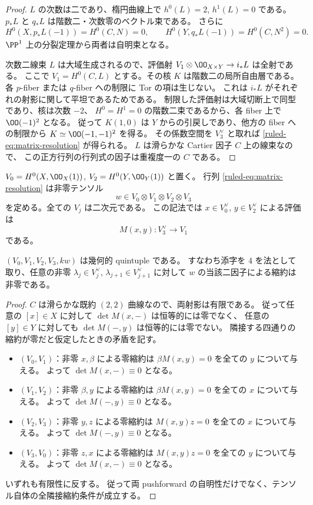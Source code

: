 \begin{proof}
$L$ の次数は二であり、楕円曲線上で $h^0(L)=2$, $h^1(L)=0$ である。
$p_*L$ と $q_*L$ は階数二・次数零のベクトル束である。
さらに
\[
 H^0(X,p_*L(-1))=H^0(C,N)=0,
 \qquad H^0(Y,q_*L(-1))=H^0(C,N^2)=0.
\]
$\PP^1$ 上の分裂定理から両者は自明束となる。

次数二線束 $L$ は大域生成されるので、評価射
$V_1\otimes\OO_{X\times Y}\to i_*L$ は全射である。
ここで $V_1=H^0(C,L)$ とする。その核 $K$ は階数二の局所自由層である。
各 $p$-fiber または $q$-fiber への制限に Tor の項は生じない。
これは $i_*L$ がそれぞれの射影に関して平坦であるためである。
制限した評価射は大域切断上で同型であり、核は次数 $-2$、
$H^0=H^1=0$ の階数二束であるから、各 fiber 上で $\OO(-1)^2$ となる。
従って $K(1,0)$ は $Y$ からの引戻しであり、他方の fiber への制限から
$K\simeq\OO(-1,-1)^2$ を得る。
その係数空間を $V_3^\vee$ と取れば \eqref{ruled-eq:matrix-resolution} が得られる。
$L$ は滑らかな Cartier 因子 $C$ 上の線束なので、
この正方行列の行列式の因子は重複度一の $C$ である。
\end{proof}

$V_0=H^0(X,\OO_X(1))$, $V_2=H^0(Y,\OO_Y(1))$ と置く。
行列 \eqref{ruled-eq:matrix-resolution} は非零テンソル
\[
 w\in V_0\otimes V_1\otimes V_2\otimes V_3
\]
を定める。全ての $V_j$ は二次元である。
この記法では $x\in V_0^\vee$, $y\in V_2^\vee$ による評価は
\[
 M(x,y):V_3^\vee\longrightarrow V_1
\]
である。

\begin{proposition}\label{ruled-prop:geometric}
$(V_0,V_1,V_2,V_3,kw)$ は幾何的 quintuple である。
すなわち添字を $4$ を法として取り、任意の非零
$\lambda_j\in V_j^\vee$, $\lambda_{j+1}\in V_{j+1}^\vee$ に対して
$w$ の当該二因子による縮約は非零である。
\end{proposition}

\begin{proof}
$C$ は滑らかな既約 $(2,2)$ 曲線なので、両射影は有限である。
従って任意の $[x]\in X$ に対して $\det M(x,-)$ は恒等的には零でなく、
任意の $[y]\in Y$ に対しても $\det M(-,y)$ は恒等的には零でない。
隣接する四通りの縮約が零だと仮定したときの矛盾を記す。
\begin{itemize}
\item $(V_0,V_1)$：非零 $x,\beta$ による零縮約は
  $\beta M(x,y)=0$ を全ての $y$ について与える。
  よって $\det M(x,-)\equiv0$ となる。
\item $(V_1,V_2)$：非零 $\beta,y$ による零縮約は
  $\beta M(x,y)=0$ を全ての $x$ について与える。
  よって $\det M(-,y)\equiv0$ となる。
\item $(V_2,V_3)$：非零 $y,z$ による零縮約は
  $M(x,y)z=0$ を全ての $x$ について与える。
  よって $\det M(-,y)\equiv0$ となる。
\item $(V_3,V_0)$：非零 $z,x$ による零縮約は
  $M(x,y)z=0$ を全ての $y$ について与える。
  よって $\det M(x,-)\equiv0$ となる。
\end{itemize}
いずれも有限性に反する。
従って両 pushforward の自明性だけでなく、テンソル自体の全隣接縮約条件が成立する。
\end{proof}

